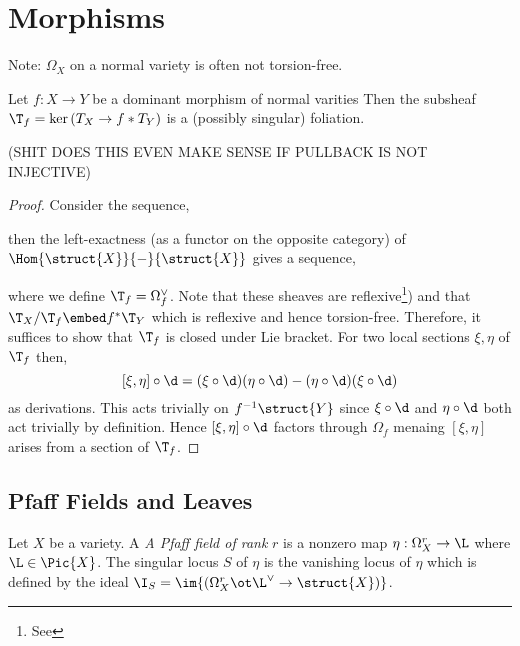 \documentclass[12pt]{article}
\begin{document}
\section{Morphisms}

Note: $\Omega_X$ on a normal variety is often not torsion-free.

\newcommand{\sat}{\mathrm{sat}}

\begin{prop}
Let $f : X \to Y$ be a dominant morphism of normal varities Then the subsheaf $\T_f = \ker{(T_X \to f* T_Y)}$ is a (possibly singular) foliation.
\end{prop}

(SHIT DOES THIS EVEN MAKE SENSE IF PULLBACK IS NOT INJECTIVE)

\begin{proof}
Consider the sequence,
\begin{center}
\end{center}
then the left-exactness (as a functor on the opposite category) of $\Hom{\struct{X}}{-}{\struct{X}}$ gives a sequence,
\begin{center}
\end{center}
where we define $\T_f = \Omega_f^\vee$. Note that these sheaves are reflexive\footnote{See }) and that $\T_X / \T_f \embed f^* \T_Y$ which is reflexive and hence torsion-free. Therefore, it suffices to show that $\T_f$ is closed under Lie bracket. For two local sections $\xi, \eta$ of $\T_f$ then,
\[ [\xi, \eta] \circ \d = (\xi \circ \d)(\eta \circ \d) - (\eta \circ \d)(\xi \circ \d) \]
as derivations. This acts trivially on $f^{-1} \struct{Y}$ since $\xi \circ \d$ and $\eta \circ \d$ both act trivially by definition. Hence $[\xi, \eta] \circ \d$ factors through $\Omega_f$ menaing $[\xi, \eta]$ arises from a section of $\T_f$. 
\end{proof}

\subsection{Pfaff Fields and Leaves}


\begin{defn}
Let $X$ be a variety. A \textit{A Pfaff field of rank} $r$ is a nonzero map $\eta : \Omega^r_X \to \L$ where $\L \in \Pic{X}$. The singular locus $S$ of $\eta$ is the vanishing locus of $\eta$ which is defined by the ideal $\I_S = \im{(\Omega_X^r \ot \L^\vee \to \struct{X})}$.  
\end{defn}
\end{document}
